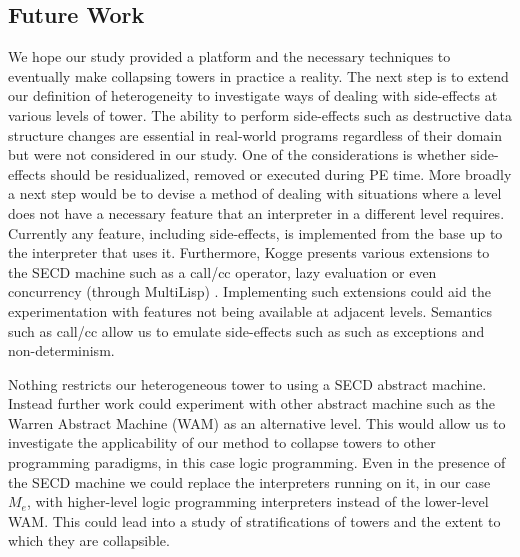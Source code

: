 \documentclass[a4paper,12pt,twoside,openright]{report}
\theoremstyle{definition}
\newcommand{\mslang}{$\lambda_{\uparrow\downarrow}$}
\newcommand{\mevl}{$M_{e}$}
\begin{document}
\subsection{Future Work}\label{subsec:future}
We hope our study provided a platform and the necessary techniques to eventually make collapsing towers in practice a reality. The next step is to extend our definition of heterogeneity to investigate ways of dealing with side-effects at various levels of tower. The ability to perform side-effects such as destructive data structure changes are essential in real-world programs regardless of their domain but were not considered in our study.
One of the considerations is whether side-effects should be residualized, removed or executed during PE time. More broadly a next step would be to devise a method of dealing with situations where a level does not have a necessary feature that an interpreter in a different level requires. Currently any feature, including side-effects, is implemented from the base up to the interpreter that uses it. Furthermore, Kogge presents various extensions to the SECD machine such as a call/cc operator, lazy evaluation or even concurrency (through MultiLisp) \cite{kogge1990architecture}. Implementing such extensions could aid the experimentation with features not being available at adjacent levels. Semantics such as call/cc allow us to emulate side-effects such as such as exceptions and non-determinism.

Nothing restricts our heterogeneous tower to using a SECD abstract machine. Instead further work could experiment with other abstract machine such as the Warren Abstract Machine (WAM) \cite{warren1983abstract} as an alternative level. This would allow us to investigate the applicability of our method to collapse towers to other programming paradigms, in this case logic programming. Even in the presence of the SECD machine we could replace the interpreters running on it, in our case \mevl, with higher-level logic programming interpreters instead of the lower-level WAM. This could lead into a study of stratifications of towers and the extent to which they are collapsible.
\end{document}
